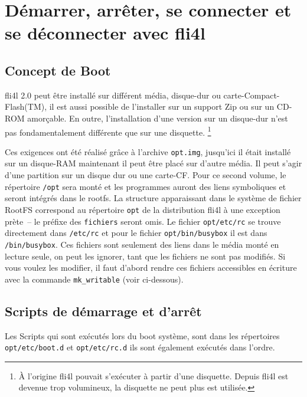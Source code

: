 
\section{Démarrer, arrêter, se connecter et se déconnecter avec fli4l}

\subsection{Concept de Boot}

fli4l 2.0 peut être installé sur différent média, disque-dur ou
carte-Compact-Flash(TM), il est aussi possible de l’installer sur un support
Zip ou sur un CD-ROM amorçable. En outre, l’installation d’une version sur un
disque-dur n'est pas fondamentalement différente que sur une disquette.
\footnote{ À l'origine fli4l pouvait s'exécuter à partir d'une disquette. Depuis
fli4l est devenue trop volumineux, la disquette ne peut plus est utilisée.}

Ces exigences ont été réalisé grâce à l’archive \texttt{opt.img}, jusqu'ici il était
installé sur un disque-RAM maintenant il peut être placé sur d’autre média.
Il peut s'agir d'une partition sur un disque dur ou une carte-CF. Pour ce second
volume, le répertoire \texttt{/opt} sera monté et les programmes auront des liens symboliques
et seront intégrés dans le rootfs. La structure apparaissant dans le système de fichier
RootFS correspond au répertoire \texttt{opt} de la distribution fli4l à une exception prète~--
le préfixe des \texttt{fichiers} seront omis. Le fichier \texttt{opt/etc/rc} se trouve
directement dans \texttt{/etc/rc} et pour le fichier \texttt{opt/bin/busybox} il est
dans \texttt{/bin/busybox}. Ces fichiers sont seulement des liens dans le média monté en
lecture seule, on peut les ignorer, tant que les fichiers ne sont pas modifiés. Si vous
voulez les modifier, il faut d'abord rendre ces fichiers accessibles en écriture
avec la commande \texttt{mk\_writable} (voir ci-dessous).


\subsection{Scripts de démarrage et d'arrêt}

Les Scripts qui sont exécutés lors du boot système, sont dans les répertoires
\texttt{opt/etc/boot.d} et \texttt{opt/etc/rc.d} ils sont également exécutés
dans l'ordre.



